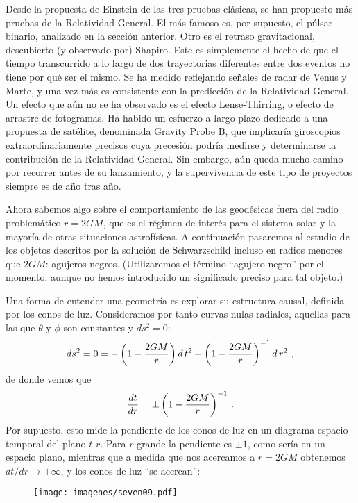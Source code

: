 \documentclass[11pt,b5paper,openany,twoside]{book}
\begin{document}
Desde la propuesta de Einstein de las tres pruebas clásicas, se han propuesto más pruebas de la Relatividad General.
El más famoso es, por supuesto, el púlsar binario, analizado en la sección anterior.
Otro es el retraso gravitacional, descubierto (y observado por) Shapiro.
Este es simplemente el hecho de que el tiempo transcurrido a lo largo de dos trayectorias diferentes entre dos eventos no tiene por qué ser el mismo.
Se ha medido reflejando señales de radar de Venus y Marte, y una vez más es consistente con la predicción de la Relatividad General.
Un efecto que aún no se ha observado es el efecto Lense-Thirring, o efecto de arrastre de fotogramas.
Ha habido un esfuerzo a largo plazo dedicado a una propuesta de satélite, denominada Gravity Probe B, que implicaría giroscopios extraordinariamente precisos cuya precesión podría medirse y determinarse la contribución de la Relatividad General.
Sin embargo, aún queda mucho camino por recorrer antes de su lanzamiento, y la supervivencia de este tipo de proyectos siempre es de año tras año.

Ahora sabemos algo sobre el comportamiento de las geodésicas fuera del radio problemático $r=2GM$, que es el régimen de interés para el sistema solar y la mayoría de otras situaciones astrofísicas.
A continuación pasaremos al estudio de los objetos descritos por la solución de Schwarzschild incluso en radios menores que $2GM$: agujeros negros.
(Utilizaremos el término ``agujero negro'' por el momento, aunque no hemos introducido un significado preciso para tal objeto.)

Una forma de entender una geometría es explorar su estructura causal, definida por los conos de luz.
Consideramos por tanto curvas nulas radiales, aquellas para las que $\theta$ y $\phi$ son constantes y $ds^2=0$:
\begin{equation}
ds^2 = 0 = -\left(1-{{2GM}\over r}\right) d\,t^2
+\left(1-{{2GM}\over r}\right)^{-1} d\,r^2 \ ,\label{7.63}
\end{equation}
de donde vemos que
\begin{equation}
{{dt}\over{dr}}=\pm \left(1-{{2GM}\over r}\right)^{-1}\,.\label{7.64}
\end{equation}
Por supuesto, esto mide la pendiente de los conos de luz en un diagrama espacio-temporal del plano $t$-$r$.
Para $r$ grande la pendiente es $\pm 1$, como sería en un espacio plano, mientras que a medida que nos acercamos a $r=2GM$ obtenemos $dt/dr\rightarrow \pm\infty$, y los conos de luz ``se acercan'':

\begin{figure}[h]
\centering
\texttt{[image: imagenes/seven09.pdf]}
\end{figure}
\end{document}
